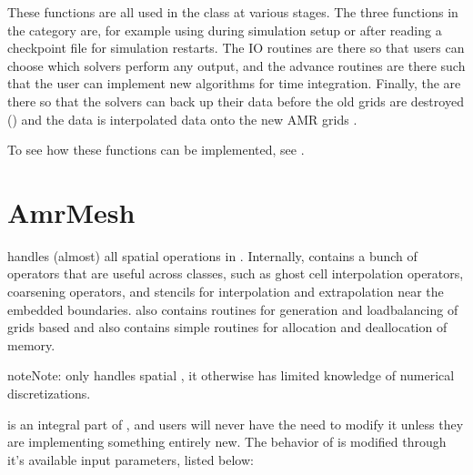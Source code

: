 \documentclass[letterpaper,10pt,english]{sphinxmanual}
\begin{document}
These functions are all used in the  class at various stages.
The three functions in the category  are, for example using during simulation setup or after reading a checkpoint file for simulation restarts.
The IO routines are there so that users can choose which solvers perform any output, and the advance routines are there such that the user can implement new algorithms for time integration.
Finally, the  are there so that the solvers can back up their data before the old grids are destroyed () and the data is interpolated data onto the new AMR grids .

To see how these functions can be implemented, see {\hyperref[\detokenize{Tutorials/Tutorial:chap-tutorial}]{}}.


\section{AmrMesh}
\label{\detokenize{Source/AmrMesh:amrmesh}}\label{\detokenize{Source/AmrMesh:chap-amrmesh}}\label{\detokenize{Source/AmrMesh::doc}}
{\hyperref[\detokenize{Source/AmrMesh:chap-amrmesh}]{}} handles (almost) all spatial operations in .
Internally, {\hyperref[\detokenize{Source/AmrMesh:chap-amrmesh}]{}} contains a bunch of operators that are useful across classes, such as ghost cell interpolation operators, coarsening operators, and stencils for interpolation and extrapolation near the embedded boundaries. {\hyperref[\detokenize{Source/AmrMesh:chap-amrmesh}]{}} also contains routines for generation and load\sphinxhyphen{}balancing of grids based and also contains simple routines for allocation and deallocation of memory.

\begin{sphinxadmonition}{note}{Note:}
{\hyperref[\detokenize{Source/AmrMesh:chap-amrmesh}]{}} only handles spatial , it otherwise has limited knowledge of numerical discretizations.
\end{sphinxadmonition}

{\hyperref[\detokenize{Source/AmrMesh:chap-amrmesh}]{}} is an integral part of , and users will never have the need to modify it unless they are implementing something entirely new. The behavior of {\hyperref[\detokenize{Source/AmrMesh:chap-amrmesh}]{}} is modified through it’s available input parameters, listed below:
\end{document}

